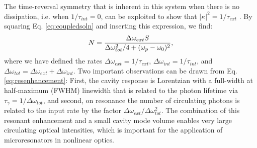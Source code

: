 The time-reversal symmetry that is inherent in this system when there is no dissipation, i.e. when $1/\tau_{int}=0$, can be exploited to show that $|\kappa|^2=1/\tau_{ext}$ \cite{Haus1984}. By squaring Eq. \ref{eq:coupledsoln} and inserting this expression, we find:
% 
   \begin{equation}
   N=\frac{\Delta\omega_{ext}S}{\Delta\omega_{tot}^2/4+(\omega_{p}-\omega_0)^2}, \label{eq:resenhancement}
   \end{equation}
   where we have defined the rates $\Delta\omega_{ext}=1/\tau_{ext}$, $\Delta\omega_{int}=1/\tau_{int}$, and $\Delta\omega_{tot}=\Delta\omega_{ext}+\Delta\omega_{int}$. Two important observations can be drawn from Eq. \ref{eq:resenhancement}: First, the cavity response is Lorentzian with a full-width at half-maximum (FWHM) linewidth that is related to the photon lifetime via $\tau_\gamma=1/\Delta\omega_{tot}$, and second, on resonance the number of circulating photons is related to the input rate by the factor $\Delta\omega_{ext}/\Delta\omega_{tot}^2$. The combination of this resonant enhancement and a small cavity mode volume enables very large circulating optical intensities, which is important for the application of microresonators in nonlinear optics.
   
